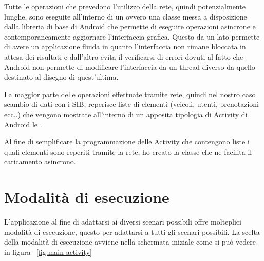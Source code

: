 Tutte le operazioni che prevedono l'utilizzo della rete, quindi potenzialmente lunghe, sono eseguite all'interno di un  ovvero una classe messa a disposizione dalla libreria di base di Android che permette di eseguire operazioni asincrone e contemporaneamente aggiornare l'interfaccia grafica. Questo da un lato permette di avere un applicazione fluida in quanto l'interfaccia non rimane bloccata in attesa dei risultati e dall'altro evita il verificarsi di errori dovuti al fatto che Android non permette di modificare l'interfaccia da un thread diverso da quello destinato al disegno di quest'ultima.

La maggior parte delle operazioni effettuate tramite rete, quindi nel nostro caso scambio di dati con i SIB, reperisce liste di elementi (veicoli, utenti, prenotazioni ecc..) che vengono mostrate all'interno di un apposita tipologia di Activity di Android le .

Al fine di semplificare la programmazione delle Activity che contengono liste i quali elementi sono reperiti tramite la rete, ho creato la classe  che ne facilita il caricamento asincrono.


\section{Modalità di esecuzione}

L'applicazione al fine di adattarsi ai diversi scenari possibili offre molteplici modalità di esecuzione, questo per adattarsi a tutti gli scenari possibili. La scelta della modalità di esecuzione avviene nella schermata iniziale come si può vedere in figura ~\ref{fig:main-activity}


